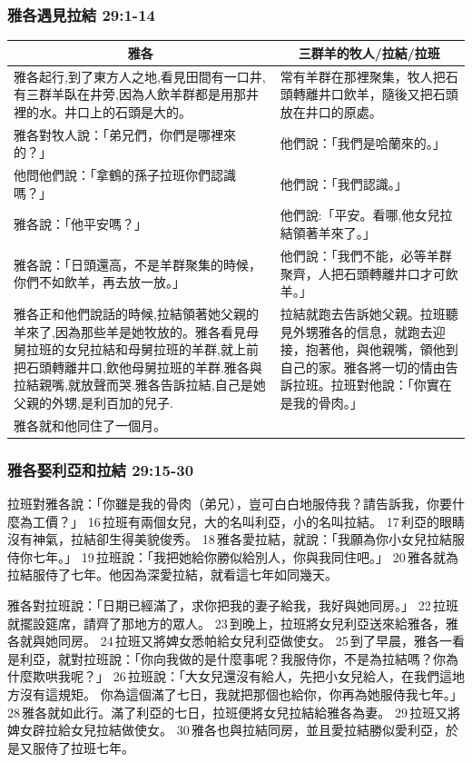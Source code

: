 \subsubsection{雅各遇見拉結 29:1-14}
\begin{table}[H]
\centering
\begin{tabular}{p{9.95cm}|p{7.75cm}}\hline\hline
\multicolumn{1}{c|}{雅各}&\multicolumn{1}{c}{三群羊的牧人/拉結/拉班}\\\hline
雅各起行,到了東方人之地,看見田間有一口井,有三群羊臥在井旁,因為人飲羊群都是用那井裡的水。井口上的石頭是大的。&常有羊群在那裡聚集，牧人把石頭轉離井口飲羊，隨後又把石頭放在井口的原處。\\\hline
雅各對牧人說：「弟兄們，你們是哪裡來的？」&他們說：「我們是哈蘭來的。」\\\hline
他問他們說：「拿鶴的孫子拉班你們認識嗎？」&他們說：「我們認識。」\\\hline
雅各說：「他平安嗎？」&他們說:「平安。看哪,他女兒拉結領著羊來了。」 \\\hline
雅各說：「日頭還高，不是羊群聚集的時候，你們不如飲羊，再去放一放。」&他們說：「我們不能，必等羊群聚齊，人把石頭轉離井口才可飲羊。」 \\\hline
雅各正和他們說話的時候,拉結領著她父親的羊來了,因為那些羊是她牧放的。雅各看見母舅拉班的女兒拉結和母舅拉班的羊群,就上前把石頭轉離井口,飲他母舅拉班的羊群.雅各與拉結親嘴,就放聲而哭.雅各告訴拉結,自己是她父親的外甥,是利百加的兒子.&拉結就跑去告訴她父親。拉班聽見外甥雅各的信息，就跑去迎接，抱著他，與他親嘴，領他到自己的家。雅各將一切的情由告訴拉班。拉班對他說：「你實在是我的骨肉。」\\\hline
雅各就和他同住了一個月。&\\\hline
\end{tabular}
\end{table}



\subsubsection{雅各娶利亞和拉結 29:15-30}
拉班對雅各說：「你雖是我的骨肉（弟兄），豈可白白地服侍我？請告訴我，你要什麼為工價？」 16 拉班有兩個女兒，大的名叫利亞，小的名叫拉結。 17 利亞的眼睛沒有神氣，拉結卻生得美貌俊秀。 18 雅各愛拉結，就說：「我願為你小女兒拉結服侍你七年。」 19 拉班說：「我把她給你勝似給別人，你與我同住吧。」 20 雅各就為拉結服侍了七年。他因為深愛拉結，就看這七年如同幾天。

雅各對拉班說：「日期已經滿了，求你把我的妻子給我，我好與她同房。」 22 拉班就擺設筵席，請齊了那地方的眾人。 23 到晚上，拉班將女兒利亞送來給雅各，雅各就與她同房。 24 拉班又將婢女悉帕給女兒利亞做使女。 25 到了早晨，雅各一看是利亞，就對拉班說：「你向我做的是什麼事呢？我服侍你，不是為拉結嗎？你為什麼欺哄我呢？」 26 拉班說：「大女兒還沒有給人，先把小女兒給人，在我們這地方沒有這規矩。
你為這個滿了七日，我就把那個也給你，你再為她服侍我七年。」 28 雅各就如此行。滿了利亞的七日，拉班便將女兒拉結給雅各為妻。 29 拉班又將婢女辟拉給女兒拉結做使女。 30 雅各也與拉結同房，並且愛拉結勝似愛利亞，於是又服侍了拉班七年。

